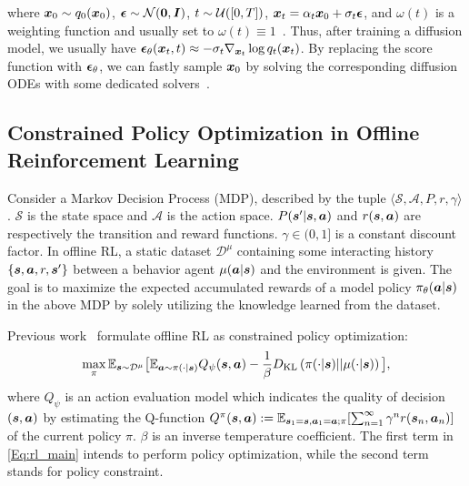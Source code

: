 where ${\bm{x}}_0\sim q_0({\bm{x}}_0)$, $\bm{\epsilon}\sim{\mathcal{N}}(\bm{0},{\bm{I}})$, $t\sim{\mathcal{U}}([0,T])$, ${\bm{x}}_t=\alpha_t {\bm{x}}_0 + \sigma_t \bm{\epsilon}$, and $\omega(t)$ is a weighting function and usually set to $\omega(t)\equiv 1$~\citep{ho2020denoising}.
Thus, after training a diffusion model, we usually have $\bm{\epsilon}_\theta({\bm{x}}_t,t)\approx -\sigma_t\nabla_{{\bm{x}}_t}\log q_t({\bm{x}}_t)$. By replacing the score function with $\bm{\epsilon}_\theta$, we can fastly sample ${\bm{x}}_0$ by solving the corresponding diffusion ODEs with some dedicated solvers~\citep{song2020denoising,lu2022dpm}.





 


\subsection{Constrained Policy Optimization in Offline Reinforcement Learning}

Consider a Markov Decision Process (MDP), described by the tuple $\langle\mathcal{S},\mathcal{A}, P,r,\gamma\rangle$. $\mathcal{S}$ is the state space and $\mathcal{A}$ is the action space. $P({\bm{s}}'|{\bm{s}},{\bm{a}})$ and $r({\bm{s}}, {\bm{a}})$ are respectively the transition and reward functions. $\gamma \in (0,1]$ is a constant discount factor. In offline RL, a static dataset $\mathcal{D}^\mu$ containing some interacting history $\{{\bm{s}}, {\bm{a}}, r, {\bm{s}}'\}$ between a behavior agent $\mu({\bm{a}}|{\bm{s}})$ and the environment is given. The goal is to maximize the expected accumulated rewards of a model policy $\pi_\theta({\bm{a}}|{\bm{s}})$ in the above MDP by solely utilizing the knowledge learned from the dataset.

Previous work~\citep{rwr, awr} formulate offline RL as constrained policy optimization:
\begin{equation}
\label{Eq:rl_main}
    \max_{\pi} \mathbb{E}_{{\bm{s}} \sim \mathcal{D}^\mu}\big[ \mathbb{E}_{{\bm{a}} \sim \pi(\cdot|{\bm{s}})} Q_\psi({\bm{s}}, {\bm{a}})
     - \frac{1}{\beta} D_{\mathrm{KL}} \left(\pi(\cdot |{\bm{s}}) || \mu(\cdot |{\bm{s}}) \right)\big],
\end{equation}
where $Q_\psi$ is an action evaluation model which indicates the quality of decision $({\bm{s}}, {\bm{a}})$ 
by estimating the Q-function $Q^\pi({\bm{s}}, {\bm{a}}) := \mathbb{E}_{{\bm{s}}_1={\bm{s}}, {\bm{a}}_1={\bm{a}}; \pi} [\sum_{n=1}^\infty \gamma^n r({\bm{s}}_n, {\bm{a}}_n)]$ of the current policy $\pi$.  
$\beta$ is an inverse temperature coefficient. The first term in \eqref{Eq:rl_main} intends to perform policy optimization, while the second term stands for policy constraint. 

